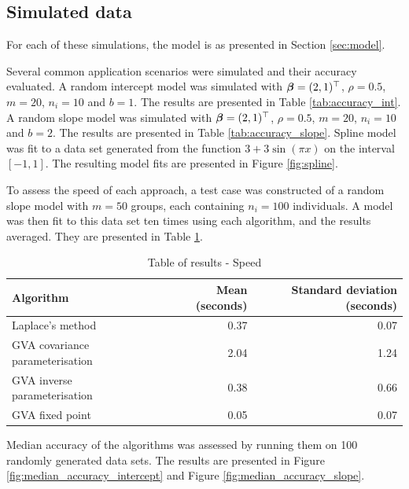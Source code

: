 			\subsection{Simulated data}
					
			For each of these simulations, the model is as presented in Section \ref{sec:model}.
					
			Several common application scenarios were simulated and their accuracy evaluated. A random intercept model was simulated with ${\boldsymbol \beta} = (2, 1)^\top$, $\rho = 0.5$, $m = 20$, $n_i = 10$ and $b = 1$. The results are
			presented in Table \ref{tab:accuracy_int}. A random slope model was simulated with ${\boldsymbol \beta} = (2, 1)^\top$,
			$\rho = 0.5$, $m = 20$, $n_i = 10$ and $b = 2$. The results are presented in Table \ref{tab:accuracy_slope}.
			Spline model was fit to a data set generated from the function $3 + 3 \sin{(\pi x)}$ on the interval $[-1,
			1]$. The resulting model fits are presented in Figure \ref{fig:spline}.
					
			To assess the speed of each approach, a test case was constructed of a random slope model with $m=50$ groups,	each containing $n_i = 100$ individuals. A model was then fit to this data set ten times using each algorithm, and the results averaged. They are presented in Table \ref{tab:application_slope_speed}.

			\begin{table}
				\caption{Table of results - Speed}
				\label{tab:application_slope_speed}
				\begin{tabular}{|l|rr|}
					\hline
					Algorithm & Mean (seconds) & Standard deviation (seconds) \\
					\hline
					Laplace's method & 0.37 & 0.07 \\
					GVA covariance parameterisation & 2.04 & 1.24 \\
					GVA inverse parameterisation & 0.38 & 0.66 \\
					GVA fixed point & 0.05 & 0.07 \\
					\hline
				\end{tabular}
			\end{table}

					
			Median accuracy of the algorithms was assessed by running them on 100 randomly generated data sets. The	results are presented in Figure \ref{fig:median_accuracy_intercept} and Figure
			\ref{fig:median_accuracy_slope}.
					
